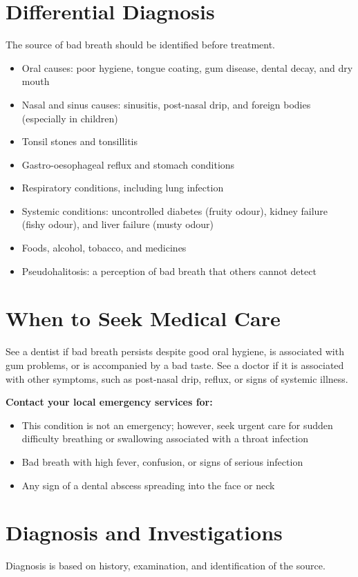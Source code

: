 \section*{Differential Diagnosis}
The source of bad breath should be identified before treatment.

\begin{itemize}
    \item Oral causes: poor hygiene, tongue coating, gum disease, dental decay, and dry mouth
    \item Nasal and sinus causes: sinusitis, post-nasal drip, and foreign bodies (especially in children)
    \item Tonsil stones and tonsillitis
    \item Gastro-oesophageal reflux and stomach conditions
    \item Respiratory conditions, including lung infection
    \item Systemic conditions: uncontrolled diabetes (fruity odour), kidney failure (fishy odour), and liver failure (musty odour)
    \item Foods, alcohol, tobacco, and medicines
    \item Pseudohalitosis: a perception of bad breath that others cannot detect
\end{itemize}

\section*{When to Seek Medical Care}
See a dentist if bad breath persists despite good oral hygiene, is associated with gum problems, or is accompanied by a bad taste. See a doctor if it is associated with other symptoms, such as post-nasal drip, reflux, or signs of systemic illness.

\textbf{Contact your local emergency services for:}
\begin{itemize}
    \item This condition is not an emergency; however, seek urgent care for sudden difficulty breathing or swallowing associated with a throat infection
    \item Bad breath with high fever, confusion, or signs of serious infection
    \item Any sign of a dental abscess spreading into the face or neck
\end{itemize}

\section*{Diagnosis and Investigations}
Diagnosis is based on history, examination, and identification of the source.

